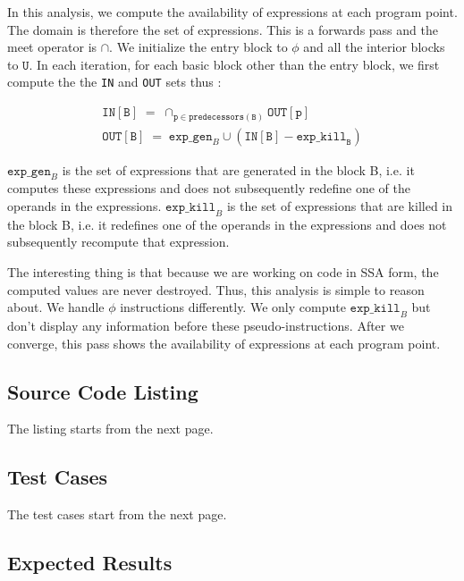 In this analysis, we compute the availability of expressions at each program point.
The domain is therefore the set of expressions.
This is a forwards pass and the meet operator is $\cap$.
We initialize the entry block to $\phi$  and all the interior blocks to $\mathtt{U}$.
In each iteration, for each basic block other than the entry block, we
first compute the the \texttt{IN} and \texttt{OUT} sets thus :

\begin{align*}
\texttt{IN}[\mathtt{B}] \; = \; \cap_{\mathtt{p} \in \texttt{predecessors}(\mathtt{B})} \texttt{OUT}[\texttt{p}] \\
\texttt{OUT}[\mathtt{B}] \; = \; \texttt{exp\_gen}_{B} \cup (\texttt{IN}[\mathtt{B}] - \texttt{exp\_kill}_{\texttt{B}})
\end{align*}

$\texttt{exp\_gen}_{B}$ is the set of expressions that are generated in the block B, i.e. it computes these
expressions and does not subsequently redefine one of the operands in the expressions.
$\texttt{exp\_kill}_{B}$ is the set of expressions that are killed in the block B, i.e. it
redefines one of the operands in the expressions and does not subsequently recompute that expression.

The interesting thing is that because we are working on code in SSA form, the computed values are never
destroyed. Thus, this analysis is simple to reason about.
We handle $\phi$ instructions differently. We only compute $\texttt{exp\_kill}_{B}$ but don't display any
information before these pseudo-instructions.
After we converge, this pass shows the availability of expressions at each program point.

\subsection{Source Code Listing}

The listing starts from the next page.



\subsection{Test Cases}

The test cases start from the next page.



\subsection{Expected Results}

